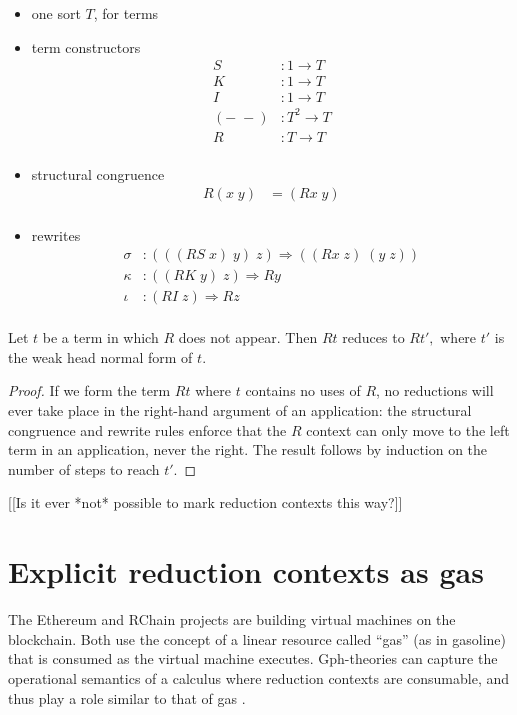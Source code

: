 \documentclass[a4paper,UKenglish]{lipics-v2016}
\begin{document}
\begin{itemize}
  \item one sort $T$, for terms
  \item term constructors
  \[\begin{array}{rl}
    S&:1 \to T\\
    K&:1 \to T\\
    I&:1 \to T\\
    (-\; -)&: T^2 \to T\\
    R&:T \to T\\
  \end{array}\]
  \item structural congruence
  \[\begin{array}{rl}
    R(x\; y) &= (Rx\; y)\\
  \end{array}\]
  \item rewrites
  \[\begin{array}{rl}
    \sigma&:(((RS\; x)\; y)\; z) \Rightarrow ((Rx\; z)\; (y\; z))\\
    \kappa&:((RK\; y)\; z) \Rightarrow Ry\\
    \iota&:(RI\; z) \Rightarrow Rz\\
  \end{array}\]
\end{itemize}

\begin{theorem}
  Let $t$ be a term in which $R$ does not appear.  Then $Rt$ reduces to $Rt',$ where $t'$ is the weak head normal form of $t.$
\end{theorem}

\begin{proof}
If we form the term $Rt$ where $t$ contains no uses of $R$, no reductions will ever take place in the right-hand argument of an application: the structural congruence and rewrite rules enforce that the $R$ context can only move to the left term in an application, never the right.  The result follows by induction on the number of steps to reach $t'.$
\end{proof}

[[Is it ever *not* possible to mark reduction contexts this way?]]

\section{Explicit reduction contexts as gas}
The Ethereum \cite{wood2014ethereum} and RChain \cite{RChain} projects are building virtual machines on the blockchain.  Both use the concept of a linear resource called ``gas'' (as in gasoline) that is consumed as the virtual machine executes.  Gph-theories can capture the operational semantics of a calculus where reduction contexts are consumable, and thus play a role similar to that of gas \cite{DBLP:journals/corr/StayM15}.
\end{document}
